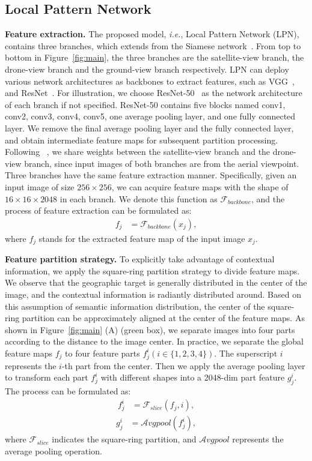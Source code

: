\documentclass[journal]{IEEEtran}
\def\ie{\emph{i.e.}}
\begin{document}
\subsection{Local Pattern Network}
\textbf{Feature extraction.}
The proposed model, \ie, Local Pattern Network (LPN), contains three branches, which extends from the Siamese network~\cite{chopra2005learning}. From top to bottom in Figure~\ref{fig:main}, the three branches are the satellite-view branch, the drone-view branch and the ground-view branch respectively. LPN can deploy various network architectures as backbones to extract features, such as VGG~\cite{vgg}, and ResNet~\cite{he2016deep}. For illustration, we choose ResNet-50~\cite{he2016deep} as the network architecture of each branch if not specified. ResNet-50 contains five blocks named conv1, conv2, conv3, conv4, conv5, one average pooling layer, and one fully connected layer. 
We remove the final average pooling layer and the fully connected layer, and obtain intermediate feature maps for subsequent partition processing. 
Following ~\cite{zheng_university-1652_nodate}, we share weights between the satellite-view branch and the drone-view branch, since input images of both branches are from the aerial viewpoint. Three branches have the same feature extraction manner. Specifically, given an input image of size $256 \times 256$, we can acquire feature maps with the shape of $16 \times 16 \times 2048$ in each branch. We denote this function as $\mathcal{F}_{backbone}$, and the process of feature extraction can be formulated as:
\begin{align}\label{extract}
    f_{j} &= \mathcal{F}_{backbone}(x_j),
\end{align}
where $f_{j}$ stands for the extracted feature map of the input image $x_j$. 

\textbf{Feature partition strategy.}\label{partition}
To explicitly take advantage of contextual information, we apply the square-ring partition strategy to divide feature maps. 
We observe that the geographic target is generally distributed in the center of the image, and the contextual information is radiantly distributed around. 
Based on this assumption of semantic information distribution, the center of the square-ring partition can be approximately aligned at the center of the feature maps. As shown in Figure~\ref{fig:main} (A) (green box), we separate images into four parts according to the distance to the image center. In practice, we separate the global feature maps $f_j$ to four feature parts $f_j^i (i\in\{1,2,3,4\})$. The superscript $i$ represents the $i$-th part from the center. 
Then we apply the average pooling layer to transform each part $f_j^i$ with different shapes into a 2048-dim part feature $g_j^i$. The process can be formulated as:
\begin{align}\label{f_ji}
    f_{j}^i &= \mathcal{F}_{slice}(f_{j}, i),
\end{align}
\begin{align}\label{g_ji}
    g_{j}^i &= \mathcal{A}{vgpool}(f_{j}^i),
\end{align}
where $\mathcal{F}_{slice}$ indicates the square-ring partition, and $\mathcal{A}{vgpool}$ represents the average pooling operation.
\end{document}
